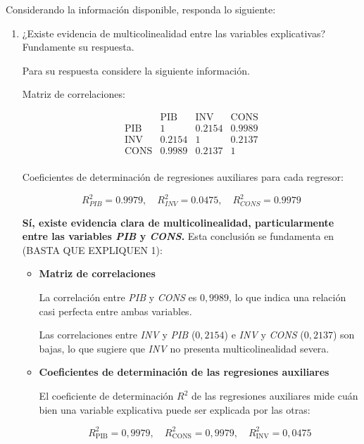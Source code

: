 \documentclass[10pt,a4paper]{article}
\begin{document}
\begin{enumerate}
Considerando la información disponible, responda lo siguiente:

\begin{enumerate}
    \item ¿Existe evidencia de multicolinealidad entre las variables explicativas? Fundamente su respuesta.

Para su respuesta considere la siguiente información.

    Matriz de correlaciones:

    \[
    \begin{array}{c|ccc}
    & \text{PIB} & \text{INV} & \text{CONS} \\
    \hline
    \text{PIB} & 1 & 0.2154 & 0.9989 \\
    \text{INV} & 0.2154 & 1 & 0.2137 \\
    \text{CONS} & 0.9989 & 0.2137 & 1 \\
    \end{array}
    \]

    Coeficientes de determinación de regresiones auxiliares para cada regresor:

    \[
    R_{PIB}^2 = 0.9979, \quad R_{INV}^2 = 0.0475, \quad R_{CONS}^2 = 0.9979
    \]

{\color{blue}
\textbf{Sí, existe evidencia clara de multicolinealidad, particularmente entre las variables \textit{PIB} y \textit{CONS}.} Esta conclusión se fundamenta en (BASTA QUE EXPLIQUEN 1):

\begin{itemize}
    \item \textbf{Matriz de correlaciones}

    La correlación entre \textit{PIB} y \textit{CONS} es $0{,}9989$, lo que indica una relación casi perfecta entre ambas variables.

    Las correlaciones entre \textit{INV} y \textit{PIB} ($0{,}2154$) e \textit{INV} y \textit{CONS} ($0{,}2137$) son bajas, lo que sugiere que \textit{INV} no presenta multicolinealidad severa.

    \item \textbf{Coeficientes de determinación de las regresiones auxiliares}

    El coeficiente de determinación $R^2$ de las regresiones auxiliares mide cuán bien una variable explicativa puede ser explicada por las otras:

    \[
    R^2_{\text{PIB}} = 0{,}9979, \quad R^2_{\text{CONS}} = 0{,}9979, \quad R^2_{\text{INV}} = 0{,}0475
    \]


\end{itemize}}
\end{enumerate}
\end{enumerate}
\end{document}
